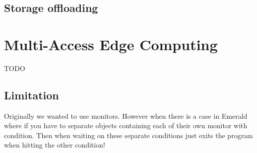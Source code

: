 \subsection{Storage offloading}


\section{Multi-Access Edge Computing}
TODO


\subsection{Limitation}
Originally we wanted to use monitors. However when there is a case in Emerald where if you have to separate objects containing each of their own monitor with condition. Then when waiting on these separate conditions just exits the program when hitting the other condition!

